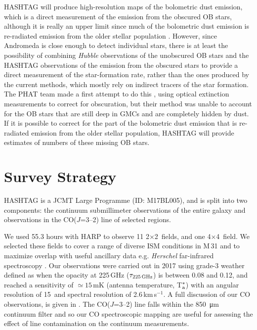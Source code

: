 \documentclass[a4paper,fleqn,usenatbib, twocolumn]{aastex63}
\begin{document}
HASHTAG will produce high-resolution maps of the bolometric dust emission, which is a direct measurement of the emission from the obscured OB stars, although it is really
an upper limit since much of the bolometric dust emission is
re-radiated emission from the older stellar population \citep{bendo2012,kennicutt2012,bendo2015,viaene2017, ford2013}. However, since Andromeda is close enough to detect individual stars, there is at least the
possibility of combining {\it Hubble} observations of the unobscured
OB stars and the HASHTAG observations of the emission from the obscured
stars to provide a direct measurement of the star-formation rate, rather
than the ones produced by the current methods, which mostly rely on indirect tracers of the
star formation. 
The PHAT team made a first attempt to do this \citep{lewis2017}, using optical extinction measurements to
correct for obscuration, but their method was unable to account for the OB stars
that are still deep in GMCs and are completely hidden by dust. If it is possible
to correct for the part of the bolometric dust emission that is
re-radiated emission from the older stellar population, HASHTAG will provide estimates of numbers of these missing OB stars.


\section{Survey Strategy}
\label{sec:surveyStragey}

HASHTAG is a JCMT Large Programme (ID: M17BL005), and is split into two components: the continuum submillimeter observations 
of the entire galaxy and observations in the CO($J$=3--2) line of selected regions. 

We used 55.3 hours with HARP \citep{buckle2009} to observe 11 
2\arcmin$\times$2\arcmin\ fields, and one 4\arcmin$\times$4\arcmin\ field. We selected these fields to cover a
range of diverse ISM conditions in M\,31 and to maximize overlap with
useful ancillary data e.g. \textit{Herschel} far-infrared spectroscopy \citep{kapala2015}. Our observations were carried out in 2017 using grade-3 weather 
defined as when the opacity at 225\,GHz ($\tau_{\rm 225\,GHz}$) is between 0.08 and 0.12, and reached a sensitivity of $\simeq15$\,mK (antenna temperature, T$_{\rm a}^*$) with an angular resolution of 15\arcsec\ and spectral resolution of 2.6\,km\,s$^{-1}$. A full discussion of our CO observations, is given in \citet{Li2020}. 
The CO($J$=3--2) line falls within the 
\SI{850}{\micro \meter} continuum filter and so our CO spectroscopic mapping are useful for assessing the
effect of line contamination on the continuum measurements.
\end{document}
